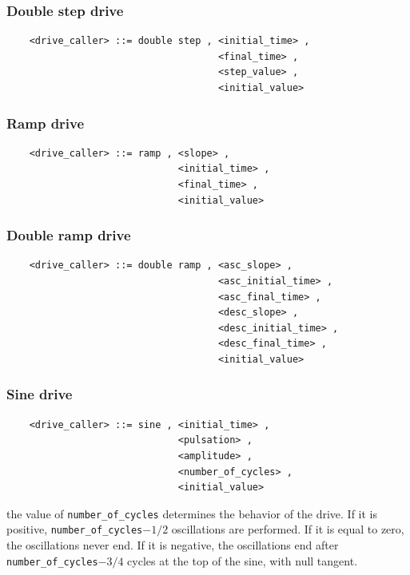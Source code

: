 \documentclass[10pt,dvips]{report}
\begin{document}
\subsubsection{Double step drive}
\begin{verbatim}
    <drive_caller> ::= double step , <initial_time> , 
                                     <final_time> ,
                                     <step_value> , 
                                     <initial_value>
\end{verbatim}

\subsubsection{Ramp drive}
\begin{verbatim}
    <drive_caller> ::= ramp , <slope> , 
                              <initial_time> ,
                              <final_time> , 
                              <initial_value>
\end{verbatim}
  
\subsubsection{Double ramp drive}
\begin{verbatim}
    <drive_caller> ::= double ramp , <asc_slope> , 
                                     <asc_initial_time> , 
                                     <asc_final_time> , 
                                     <desc_slope> , 
                                     <desc_initial_time> , 
                                     <desc_final_time> , 
                                     <initial_value>
\end{verbatim}

\subsubsection{Sine drive}
\begin{verbatim}
    <drive_caller> ::= sine , <initial_time> ,
                              <pulsation> ,
                              <amplitude> ,
                              <number_of_cycles> , 
                              <initial_value>
\end{verbatim}
the value of {\tt number\_of\_cycles} determines the behavior of the
drive. If it is positive, {\tt number\_of\_cycles}$-1/2$ oscillations are
performed. If it is equal to zero, the oscillations never end. If it is
negative, the oscillations end after 
{\tt number\_of\_cycles}$-3/4$ cycles at the top of the sine, with null
tangent.
\end{document}
